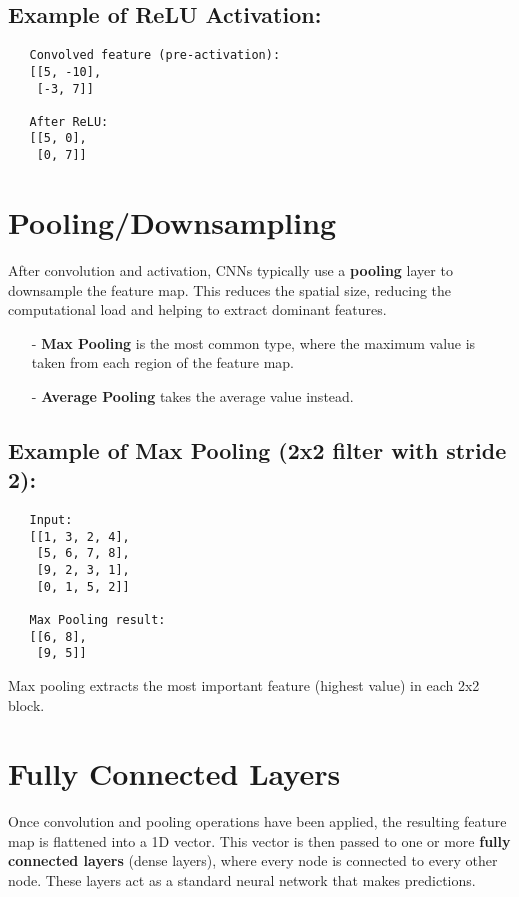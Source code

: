\documentclass[10pt]{article}
\begin{document}
\subsection{Example of ReLU Activation:}

\begin{verbatim}
   Convolved feature (pre-activation):
   [[5, -10],
    [-3, 7]]
   
   After ReLU:
   [[5, 0],
    [0, 7]]
\end{verbatim}

\section{{\bf Pooling/Downsampling}}
After convolution and activation, CNNs typically use a {\bf pooling} layer to downsample the feature map. This reduces the spatial size, reducing the computational load and helping to extract dominant features.

\begin{itemize}
   \item [-] {\bf Max Pooling} is the most common type, where the maximum value is taken from each region of the feature map.
   \item [-] {\bf Average Pooling} takes the average value instead.
\end{itemize}

\subsection{ Example of Max Pooling (2x2 filter with stride 2):}

\begin{verbatim}
   Input:
   [[1, 3, 2, 4],
    [5, 6, 7, 8],
    [9, 2, 3, 1],
    [0, 1, 5, 2]]
   
   Max Pooling result:
   [[6, 8],
    [9, 5]]
\end{verbatim}

Max pooling extracts the most important feature (highest value) in each 2x2 block.

\section{{\bf Fully Connected Layers}}
Once convolution and pooling operations have been applied, the resulting feature map is flattened into a 1D vector. This vector is then passed to one or more {\bf fully connected layers} (dense layers), where every node is connected to every other node. These layers act as a standard neural network that makes predictions.
\end{document}
